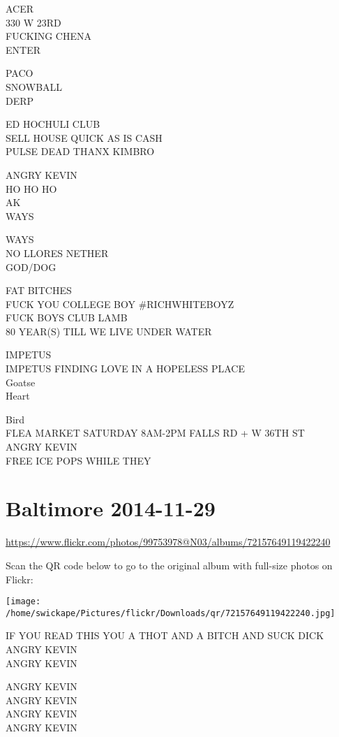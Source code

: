 \documentclass[10pt,letterpaper]{article}
\begin{document}
ACER\\
330 W 23RD\\
FUCKING CHENA\\
ENTER

PACO\\
SNOWBALL\\
DERP

ED HOCHULI CLUB\\
SELL HOUSE QUICK AS IS CASH\\
PULSE DEAD THANX KIMBRO

ANGRY KEVIN\\
HO HO HO\\
AK\\
WAYS

WAYS\\
NO LLORES NETHER\\
GOD/DOG

FAT BITCHES\\
FUCK YOU COLLEGE BOY \#RICHWHITEBOYZ\\
FUCK BOYS CLUB LAMB\\
80 YEAR(S) TILL WE LIVE UNDER WATER

IMPETUS\\
IMPETUS FINDING LOVE IN A HOPELESS PLACE\\
Goatse\\
Heart

Bird\\
FLEA MARKET SATURDAY 8AM{-}2PM FALLS RD + W 36TH ST\\
ANGRY KEVIN\\
FREE ICE POPS WHILE THEY


\section*{Baltimore 2014-11-29}

\url{https://www.flickr.com/photos/99753978@N03/albums/72157649119422240}

Scan the QR code below to go to the original album with full-size photos on Flickr:

\texttt{[image: /home/swickape/Pictures/flickr/Downloads/qr/72157649119422240.jpg]}


IF YOU READ THIS YOU A THOT AND A BITCH AND SUCK DICK\\
ANGRY KEVIN\\
ANGRY KEVIN

ANGRY KEVIN\\
ANGRY KEVIN\\
ANGRY KEVIN\\
ANGRY KEVIN
\end{document}
